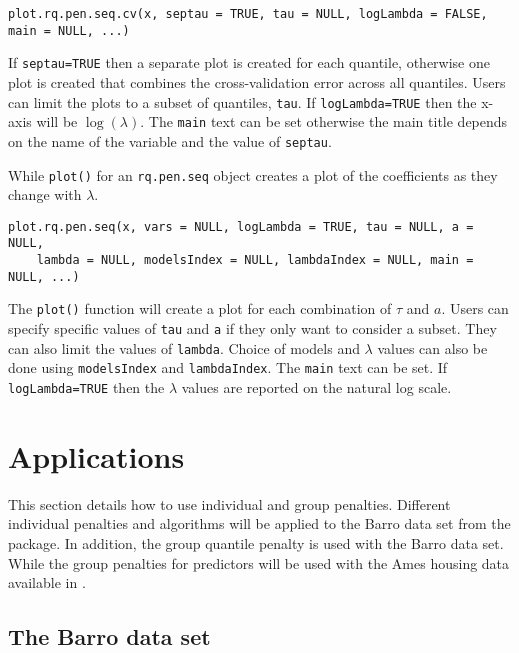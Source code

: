 \begin{verbatim}
plot.rq.pen.seq.cv(x, septau = TRUE, tau = NULL, logLambda = FALSE, main = NULL, ...)
\end{verbatim}

If \texttt{septau=TRUE} then a separate plot is created for each quantile, otherwise one plot is created that combines the cross-validation error across all quantiles. Users can limit the plots to a subset of quantiles, \texttt{tau}. If \texttt{logLambda=TRUE} then the x-axis will be \(\log(\lambda)\). The \texttt{main} text can be set otherwise the main title depends on the name of the variable and the value of \texttt{septau}.

While \texttt{plot()} for an \texttt{rq.pen.seq} object creates a plot of the coefficients as they change with \(\lambda\).

\begin{verbatim}
plot.rq.pen.seq(x, vars = NULL, logLambda = TRUE, tau = NULL, a = NULL,
    lambda = NULL, modelsIndex = NULL, lambdaIndex = NULL, main = NULL, ...)
\end{verbatim}

The \texttt{plot()} function will create a plot for each combination of \(\tau\) and \(a\). Users can specify specific values of \texttt{tau} and \texttt{a} if they only want to consider a subset. They can also limit the values of \texttt{lambda}. Choice of models and \(\lambda\) values can also be done using \texttt{modelsIndex} and \texttt{lambdaIndex}. The \texttt{main} text can be set. If \texttt{logLambda=TRUE} then the \(\lambda\) values are reported on the natural log scale.

\section{Applications}\label{applications}

This section details how to use individual and group penalties. Different individual penalties and algorithms will be applied to the Barro data set from the  package. In addition, the group quantile penalty is used with the Barro data set. While the group penalties for predictors will be used with the Ames housing data \citep{de2011ames} available in .

\subsection{The Barro data set}\label{the-barro-data-set}

